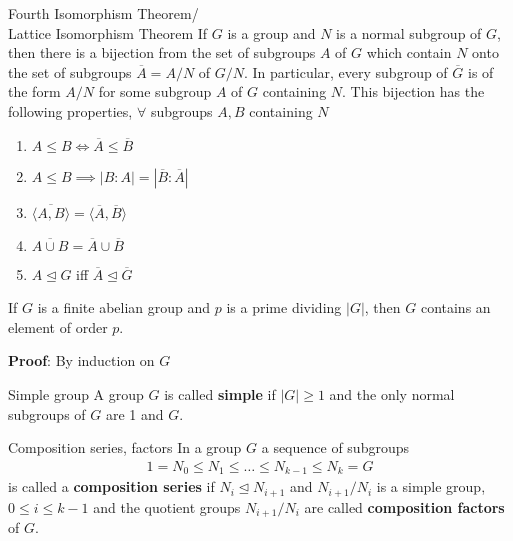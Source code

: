 \documentclass[titlepage, 12pt]{article}
\begin{document}
\begin{theorem}{Fourth Isomorphism Theorem/\\Lattice Isomorphism Theorem}{}
    If $G$ is a group and $N$ is a normal subgroup of $G$, then there is a
    bijection from the set of subgroups $A$ of $G$ which contain $N$ onto the
    set of subgroups $\overline A = A/N$ of $G/N$. In particular, every subgroup
    of $\overline G$ is of the form $A/N$ for some subgroup $A$ of $G$
    containing $N$. This bijection has the following properties, $\forall$
    subgroups $A, B$ containing $N$
    \begin{enumerate}
        \item $A\le B \iff \overline A\le\overline B$
        \item $A\le B\implies |B:A| = |\overline B:\overline A|$
        \item $\overline{\langle A, B\rangle} = \langle\overline A, \overline
            B\rangle$
        \item $\overline{A\cup B} = \overline A\cup\overline B$
        \item $A\trianglelefteq G$ iff $\overline A\trianglelefteq\overline G$
    \end{enumerate}
\end{theorem}
\begin{proposition}{}{}
    If $G$ is a finite abelian group and $p$ is a prime dividing $|G|$, then $G$
    contains an element of order $p$.
\end{proposition}
\textbf{Proof}: By induction on $G$
\begin{definition}{Simple group}{}
    A group $G$ is called \textbf{simple} if $|G|\ge 1$ and the only normal
    subgroups of $G$ are 1 and $G$.
\end{definition}
\begin{definition}{Composition series, factors}{}
    In a group $G$ a sequence of subgroups
    \begin{gather*}
        1 = N_0\le N_1\le\dots\le N_{k-1}\le N_k = G
    \end{gather*}
    is called a \textbf{composition series} if $N_i\trianglelefteq N_{i+1}$ and
    $N_{i+1}/N_i$ is a simple group, $0\le i\le k-1$ and the quotient groups
    $N_{i+1}/N_i$ are called \textbf{composition factors} of $G$.
\end{definition}
\end{document}
